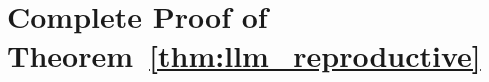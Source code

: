 \documentclass[twoside,11pt]{article}
\begin{document}


\appendix

\section{Complete Proof of Theorem~\ref{thm:llm_reproductive}}\citep{kambhampati2024llms}
\label{app:proof}
\end{document}
